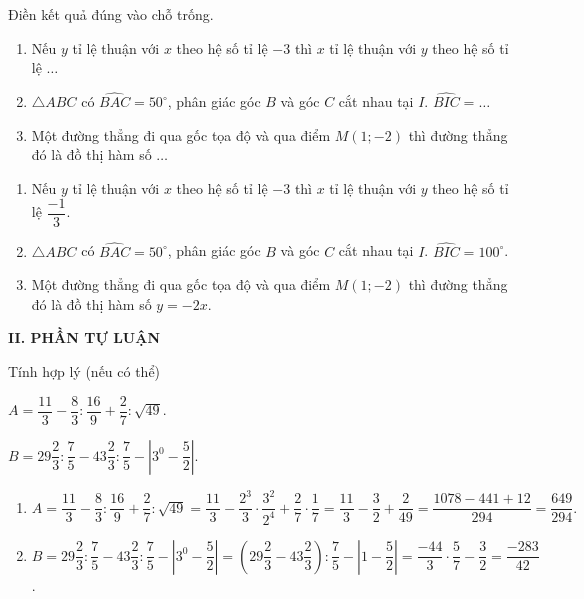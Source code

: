 	\begin{ex}%
		Điền kết quả đúng vào chỗ trống.
\begin{enumerate}
	\item Nếu $y$ tỉ lệ thuận với $x$ theo hệ số tỉ lệ $-3$ thì $x$ tỉ lệ thuận với $y$ theo hệ số tỉ lệ $\dots$
	\item $\triangle ABC$ có $\widehat{BAC}= 50^{\circ}$, phân giác góc $B$ và góc $C$ cắt nhau tại $I$. $\widehat{BIC}= \dots$
	\item Một đường thẳng đi qua gốc tọa độ và qua điểm $M(1; -2)$ thì đường thẳng đó là đồ thị hàm số $\dots$
\end{enumerate}
	\loigiai
	{
\begin{enumerate}
	\item Nếu $y$ tỉ lệ thuận với $x$ theo hệ số tỉ lệ $-3$ thì $x$ tỉ lệ thuận với $y$ theo hệ số tỉ lệ $\dfrac{-1}{3}$.
	\item $\triangle ABC$ có $\widehat{BAC}= 50^{\circ}$, phân giác góc $B$ và góc $C$ cắt nhau tại $I$. $\widehat{BIC}= 100^{\circ}$.
	\item Một đường thẳng đi qua gốc tọa độ và qua điểm $M(1; -2)$ thì đường thẳng đó là đồ thị hàm số $y= -2x.$
\end{enumerate}		
	}
\end{ex}	
	\noindent\textbf{II. PHẦN TỰ LUẬN}
	\setcounter{ex}{0}
		\begin{ex}%
	Tính hợp lý (nếu có thể)
		\begin{enumEX}{2}
			\item $A= \dfrac{11}{3}- \dfrac{8}{3}: \dfrac{16}{9}+ \dfrac{2}{7}: \sqrt{49}.$
			\item $B= 29\dfrac{2}{3}: \dfrac{7}{5}-43\dfrac{2}{3}: \dfrac{7}{5}- \left|3^0- \dfrac{5}{2}\right|$.
		\end{enumEX}
		
			\loigiai
			{
\begin{enumerate}
	\item $A= \dfrac{11}{3}- \dfrac{8}{3}: \dfrac{16}{9}+ \dfrac{2}{7}: \sqrt{49}= \dfrac{11}{3}- \dfrac{2^3}{3} \cdot \dfrac{3^2}{2^4}+ \dfrac{2}{7} \cdot \dfrac{1}{7}= \dfrac{11}{3}- \dfrac{3}{2}+ \dfrac{2}{49}= \dfrac{1078- 441+ 12}{294}= \dfrac{649}{294}.$
	\item $B= 29\dfrac{2}{3}: \dfrac{7}{5}-43\dfrac{2}{3}: \dfrac{7}{5}- \left|3^0- \dfrac{5}{2}\right|= \left(29\dfrac{2}{3}- 43\dfrac{2}{3}\right): \dfrac{7}{5}- \left|1- \dfrac{5}{2}\right|= \dfrac{-44}{3} \cdot \dfrac{5}{7}- \dfrac{3}{2}= \dfrac{-283}{42} $.
\end{enumerate}
			}
		\end{ex}
		
